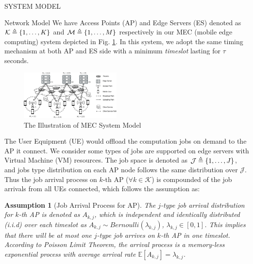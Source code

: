 \documentclass[10pt, conference, letterpaper]{IEEEtran}
\newtheorem{assumption}{Assumption}
\newcommand{\define}{\triangleq}
\DeclarePairedDelimiter{\set}{\{}{\}}
\newcommand{\apSet}{\mathcal{K}}
\newcommand{\jSpace}{\mathcal{J}}
\begin{document}
    \begin{section}{SYSTEM MODEL}
        \label{sec:model}
        \begin{subsection}{Network Model}
            We have Access Points (AP) and Edge Servers (ES) denoted as $\apSet \define \set{1,\dots,K}$ and $\mathcal{M} \define \set{1,\dots,M}$ respectively in our MEC (mobile edge computing) system depicted in Fig. \ref{fig:system}. In this system, we adopt the same timing mechanism at both AP and ES side with a minimum \emph{timeslot} lasting for $\tau$ seconds.

            \begin{figure}[ht]
                \centering
                \includegraphics[width=0.45\textwidth, trim={0.5cm 0.5cm 0.5cm 0.5cm}, clip]{system-model.pdf}
                \caption{The Illustration of MEC System Model}
                \label{fig:system}
            \end{figure}

            The User Equipment (UE) would offload the computation jobs on demand to the AP it connect.
            We consider some types of jobs are supported on edge servers with Virtual Machine (VM) resources. The job space is denoted as $\jSpace \define \set{1,\dots, J}$, and jobs type distribution on each AP node follows the same distribution over $\jSpace$.
            Thus the job arrival process on $k$-th AP ($\forall k\in\apSet$) is compounded of the job arrivals from all UEs connected, which follows the assumption as:
            \begin{assumption}[Job Arrival Process for AP]
                The $j$-type job arrival distribution for $k$-th AP is denoted as $A_{k,j}$, which is independent and identically distributed (i.i.d) over each timeslot as $A_{k,j} \sim Bernoulli(\lambda_{k,j})$, $\lambda_{k,j}\in[0,1]$. This implies that there will be at most one $j$-type job arrives on $k$-th AP in one timeslot. According to \emph{Poisson Limit Theorem}, the arrival process is a memory-less exponential process with average arrival rate $\mathbb{E}[A_{k,j}]=\lambda_{k,j}$.
            \end{assumption}


\end{subsection}
\end{section}
\end{document}
